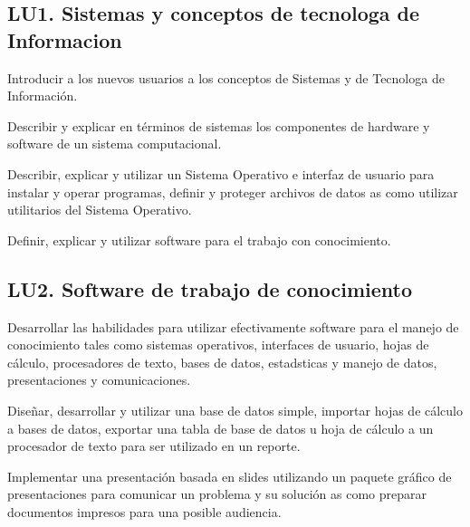 \subsection{LU1. Sistemas y conceptos de tecnolog­a de Informacion}\label{sec:LU1}
\begin{LearningUnit}
\begin{LUGoal}
\item Introducir a los nuevos usuarios a los conceptos de Sistemas y de Tecnolog­a de Información.
\end{LUGoal}

\begin{LUObjective}
\item Describir y explicar en términos de sistemas los componentes de hardware y software de un sistema computacional.
\item Describir, explicar y utilizar un Sistema Operativo e interfaz de usuario para instalar y operar programas, definir y proteger archivos de datos as­ como utilizar utilitarios del Sistema Operativo.
\item Definir, explicar y utilizar software para el trabajo con conocimiento.
\end{LUObjective}
\end{LearningUnit}

\subsection{LU2. Software de trabajo de conocimiento}\label{sec:LU2}
\begin{LearningUnit}
\begin{LUGoal}
\item Desarrollar las habilidades para utilizar efectivamente software para el manejo de conocimiento tales como sistemas operativos, interfaces de usuario, hojas de cálculo, procesadores de texto, bases de datos, estad­sticas y manejo de datos, presentaciones y comunicaciones.
\end{LUGoal}

\begin{LUObjective}
\item Diseñar, desarrollar y utilizar una base de datos simple, importar hojas de cálculo a bases de datos, exportar una tabla de base de datos u hoja de cálculo a un procesador de texto para ser utilizado en un reporte.
\item Implementar una presentación basada en slides utilizando un paquete gráfico de presentaciones para comunicar un problema y su solución as­ como preparar documentos impresos para una posible audiencia.
\end{LUObjective}
\end{LearningUnit}

